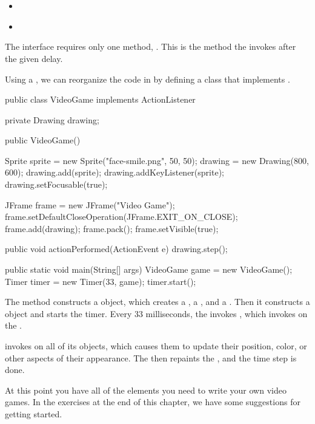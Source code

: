 \begin{itemize}
\item {} {\tt ~~~~~~~~~~~~~~~} 

\item {} {\tt ~} 
\end{itemize}

The  interface requires only one method, .
This is the method the  invokes after the given delay.

Using a , we can reorganize the code in  by defining a class that implements .

\begin{code}
public class VideoGame implements ActionListener {
    private Drawing drawing;

    public VideoGame() {
        Sprite sprite = new Sprite("face-smile.png", 50, 50);
        drawing = new Drawing(800, 600);
        drawing.add(sprite);
        drawing.addKeyListener(sprite);
        drawing.setFocusable(true);

        JFrame frame = new JFrame("Video Game");
        frame.setDefaultCloseOperation(JFrame.EXIT_ON_CLOSE);
        frame.add(drawing);
        frame.pack();
        frame.setVisible(true);
    }

    public void actionPerformed(ActionEvent e) {
        drawing.step();
    }

    public static void main(String[] args) {
        VideoGame game = new VideoGame();
        Timer timer = new Timer(33, game);
        timer.start();
    }
}
\end{code}

The  method constructs a  object, which creates a , a , and a .
Then it constructs a  object and starts the timer.
Every 33 milliseconds, the  invokes , which invokes  on the .

 invokes  on all of its  objects, which causes them to update their position, color, or other aspects of their appearance.
The  then repaints the , and the time step is done.

At this point you have all of the elements you need to write your own video games.
In the exercises at the end of this chapter, we have some suggestions for getting started.

